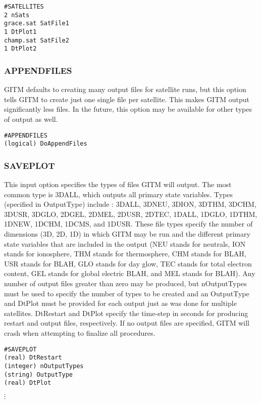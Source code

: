 \begin{verbatim}
#SATELLITES
2 nSats
grace.sat SatFile1
1 DtPlot1
champ.sat SatFile2
1 DtPlot2
\end{verbatim}

\subsubsection{APPENDFILES}
\label{appendfiles.sec}

GITM defaults to creating many output files for satellite runs, but this option tells GITM to create just one single file per satellite.  This makes GITM output significantly less files.  In the future, this option may be available for other types of output as well.

\begin{verbatim}
#APPENDFILES
(logical) DoAppendFiles
\end{verbatim}

\subsubsection{SAVEPLOT}
\label{saveplot.sec}

This input option specifies the types of files GITM will output.  The most common type is 3DALL, which outputs all primary state variables. Types (specified in OutputType) include : 3DALL, 3DNEU, 3DION, 3DTHM, 3DCHM, 3DUSR, 3DGLO, 2DGEL, 2DMEL, 2DUSR, 2DTEC, 1DALL, 1DGLO, 1DTHM, 1DNEW, 1DCHM, 1DCMS, and 1DUSR.  These file types specify the number of dimensions (3D, 2D, 1D) in which GITM may be run and the different primary state variables that are included in the output (NEU stands for neutrals, ION stands for ionosphere, THM stands for thermosphere, CHM stands for BLAH, USR stands for BLAH, GLO stands for day glow, TEC stands for total electron content, GEL stands for global electric BLAH, and MEL stands for BLAH).  Any number of output files greater than zero may be produced, but nOutputTypes must be used to specify the number of types to be created and an OutputType and DtPlot must be provided for each output just as was done for multiple satellites.  DtRestart and DtPlot specify the time-step in seconds for producing restart and output files, respectively.  If no output files are specified, GITM will crash when attempting to finalize all procedures.

\begin{verbatim}
#SAVEPLOT
(real) DtRestart
(integer) nOutputTypes 
(string) OutputType
(real) DtPlot   
\end{verbatim}
\vspace{-.1in}
\hspace{.6in} $\vdots$
\vspace{.1in}

